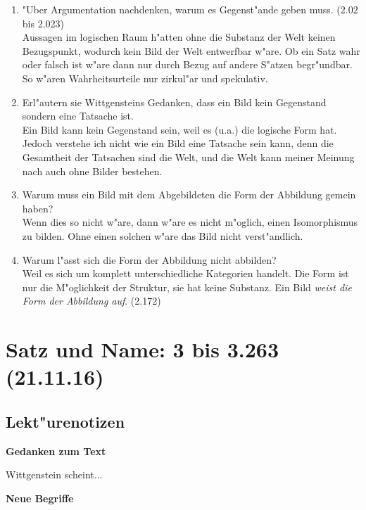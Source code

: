 \documentclass[]{scrartcl}
\begin{document}
\begin{enumerate}
  \item {\color{NavyBlue}"Uber Argumentation nachdenken, warum es Gegenst"ande geben muss. (2.02 bis 2.023)}\\
{\color{ForestGreen} Aussagen im logischen Raum h"atten ohne die Substanz der Welt keinen Bezugspunkt, wodurch kein Bild der Welt entwerfbar w"are. Ob ein Satz wahr oder falsch ist w"are dann nur durch Bezug auf andere S"atzen begr"undbar. So w"aren Wahrheitsurteile nur zirkul"ar und spekulativ.}
  \item {\color{NavyBlue}Erl"autern sie Wittgensteins Gedanken, dass ein Bild kein Gegenstand sondern eine Tatsache ist.}\\
{\color{ForestGreen} Ein Bild kann kein Gegenstand sein, weil es (u.a.) die logische Form hat. Jedoch verstehe ich nicht wie ein Bild eine Tatsache sein kann, denn die Gesamtheit der Tatsachen sind die Welt, und die Welt kann meiner Meinung nach auch ohne Bilder bestehen.}
  \item {\color{NavyBlue} Warum muss ein Bild mit dem Abgebildeten die Form der Abbildung gemein haben?}\\
{\color{ForestGreen}Wenn dies so nicht w"are, dann w"are es nicht m"oglich, einen Isomorphismus zu bilden. Ohne einen solchen w"are das Bild nicht verst"andlich.}
  \item {\color{NavyBlue}Warum l"asst sich die Form der Abbildung nicht abbilden?}\\
{\color{ForestGreen} Weil es sich um komplett unterschiedliche Kategorien handelt. Die Form ist nur die M"oglichkeit der Struktur, sie hat keine Substanz. Ein Bild \emph{weist die Form der Abbildung auf}. (2.172)}

\end{enumerate}

\section{Satz und Name: 3 bis 3.263\\(21.11.16)}


\subsection{Lekt"urenotizen}
\textbf{Gedanken zum Text}

Wittgenstein scheint...

\vspace{10pt}
\textbf{Neue Begriffe}
\end{document}
